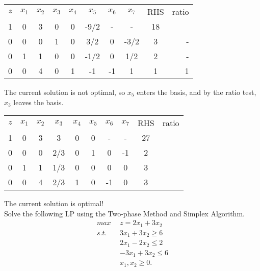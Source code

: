 \begin{center} \begin{tabular} {|c|c|c|c|c|c|c|c||c|r} \cline{1-9}
$z$	&   $x_1$ & $x_2$ & $x_3$ & $x_4$ & $x_5$ & $x_6$ & $x_7$ & RHS     &	ratio \\
\cline{1-9}
1	&     0   &    3  &	 0    & 0     & -9/2  &     - &	    - &  18 &	   \\
0	&	  0   &	    0 &	 1    &	   0  &	  3/2 &	    0 &  -3/2 &	  3     &	-  \\
0	&	  1   &	    1 &	 0    &	0     &  -1/2 &	   0  &	  1/2 &	  2   &	-  	\\
0	&	  0   &	    4 &	 0    &	 1    &  -1   &	  -1 &      1 &	  1    & 1   \\ \cline{1-9}
\end{tabular} \end{center}
\noindent The current solution is not optimal, so $x_5$ enters the basis, and by the ratio test, $x_3$ leaves the basis.

\begin{center} \begin{tabular} {|c|c|c|c|c|c|c|c||c|r} \cline{1-9}
$z$	&   $x_1$ & $x_2$ & $x_3$ & $x_4$ & $x_5$ & $x_6$ & $x_7$ & RHS     &	ratio \\
\cline{1-9}
1	&     0   &    3  &	 3    & 0     & 0  &     - &	    - &  27 &	   \\
0	&	  0   &	    0 &	 2/3  &	  0   &	  1 &	    0 &  -1 &	  2     &	 \\
0	&	  1   &	    1 &	 1/3   &   0  &  0 &	   0  &	  0 &	  3   &  	\\
0	&	  0   &	    4 &	 2/3   &	1 &  0   &	  -1 &     0&	 3    &    \\
\cline{1-9}
\end{tabular} \end{center}
The current solution is optimal! \\

\bigskip Solve the following LP using the Two-phase Method and Simplex Algorithm.
\begin{align*}
max~~ & z = 2x_1 + 3x_2   \\
s.t.~~ 
& 3x_1 + 3x_2 \ge 6  \\
& 2x_1 - 2x_2 \le 2  \\
& -3x_1 + 3x_2 \le 6   \\
& x_1, x_2 \ge 0. 
\end{align*}



